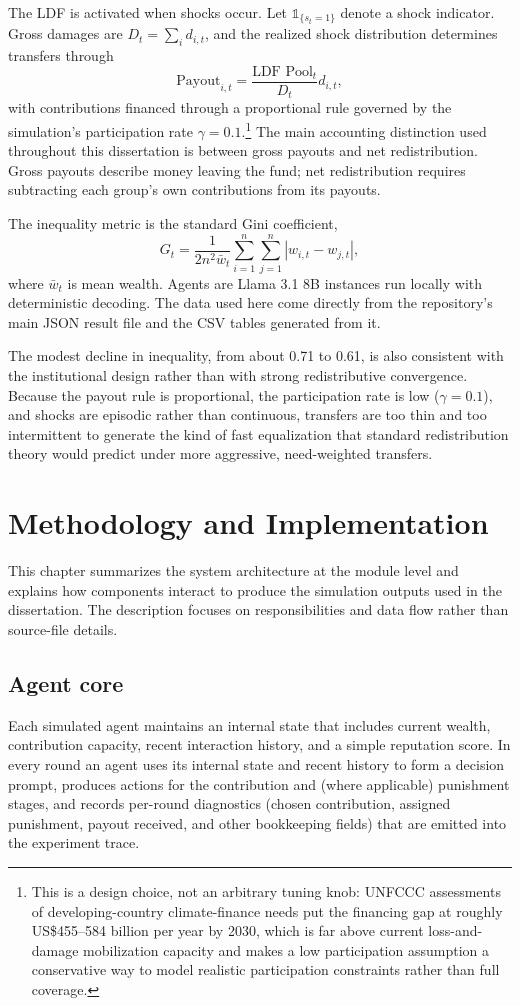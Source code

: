 \documentclass[12pt,letterpaper]{report}
\begin{document}
The LDF is activated when shocks occur. Let $\mathbb{1}_{\{s_t=1\}}$ denote a shock indicator. Gross damages are $D_t = \sum_i d_{i,t}$, and the realized shock distribution determines transfers through
\[
\text{Payout}_{i,t} = \frac{\text{LDF Pool}_t}{D_t} d_{i,t},
\]
with contributions financed through a proportional rule governed by the simulation's participation rate $\gamma=0.1$.\footnote{This is a design choice, not an arbitrary tuning knob: UNFCCC assessments of developing-country climate-finance needs put the financing gap at roughly US\$455--584 billion per year by 2030, which is far above current loss-and-damage mobilization capacity and makes a low participation assumption a conservative way to model realistic participation constraints rather than full coverage.} The main accounting distinction used throughout this dissertation is between gross payouts and net redistribution. Gross payouts describe money leaving the fund; net redistribution requires subtracting each group's own contributions from its payouts.

The inequality metric is the standard Gini coefficient,
\[
G_t = \frac{1}{2n^2\bar{w}_t} \sum_{i=1}^{n}\sum_{j=1}^{n} |w_{i,t}-w_{j,t}|,
\]
where $\bar{w}_t$ is mean wealth. Agents are Llama 3.1 8B instances run locally with deterministic decoding. The data used here come directly from the repository's main JSON result file and the CSV tables generated from it.

The modest decline in inequality, from about 0.71 to 0.61, is also consistent with the institutional design rather than with strong redistributive convergence. Because the payout rule is proportional, the participation rate is low ($\gamma = 0.1$), and shocks are episodic rather than continuous, transfers are too thin and too intermittent to generate the kind of fast equalization that standard redistribution theory would predict under more aggressive, need-weighted transfers.

\chapter{Methodology and Implementation}

This chapter summarizes the system architecture at the module level and explains how components interact to produce the simulation outputs used in the dissertation. The description focuses on responsibilities and data flow rather than source-file details.

\section{Agent core}
Each simulated agent maintains an internal state that includes current wealth, contribution capacity, recent interaction history, and a simple reputation score. In every round an agent uses its internal state and recent history to form a decision prompt, produces actions for the contribution and (where applicable) punishment stages, and records per-round diagnostics (chosen contribution, assigned punishment, payout received, and other bookkeeping fields) that are emitted into the experiment trace.
\end{document}
